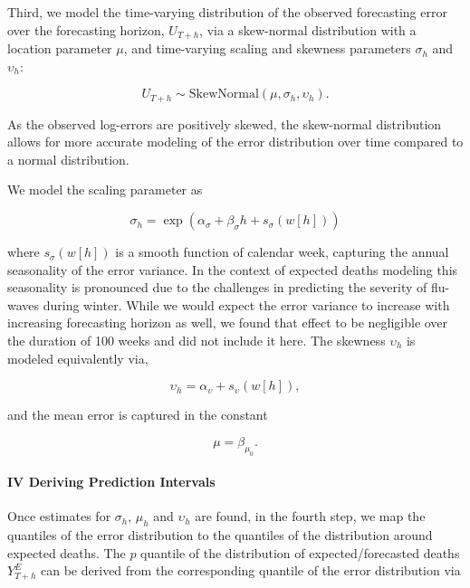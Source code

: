 \documentclass[12pt]{article}
\begin{document}
Third, we model the time-varying distribution of the observed forecasting error over the forecasting horizon, $U_{T+h}$, via a skew-normal distribution with a location parameter $\mu$, and time-varying scaling and skewness parameters $\sigma_h$ and $\upsilon_h$:

\begin{equation}
    U_{T+h} \sim \mathrm{SkewNormal}(\mu, \sigma_h, \upsilon_h).
\end{equation}

As the observed log-errors are positively skewed, the skew-normal distribution allows for more accurate modeling of the error distribution over time compared to a normal distribution.

We model the scaling parameter as

\begin{equation}
    \sigma_{h} = \exp \left( \alpha_{\sigma} + \beta_\sigma h + s_\sigma(w[h]) \right)
\end{equation}

where $s_\sigma(w[h])$ is a smooth function of calendar week, capturing the annual seasonality of the error variance. In the context of expected deaths modeling this seasonality is pronounced due to the challenges in predicting the severity of flu-waves during winter. While we would expect the error variance to increase with increasing forecasting horizon as well, we found that effect to be negligible over the duration of 100 weeks and did not include it here. The skewness $\upsilon_{h}$ is modeled equivalently via,

\begin{equation}
    \upsilon_{h} = \alpha_{\upsilon} + s_\upsilon(w[h]),
\end{equation}

and the mean error is captured in the constant

\begin{equation}
    \mu = \beta_{\mu_0}.
\end{equation}

\paragraph{IV Deriving Prediction Intervals}

Once estimates for $\sigma_h$, $\mu_h$ and $\upsilon_h$ are found, in the fourth step, we map the quantiles of the error distribution to the quantiles of the distribution around expected deaths. The $p$ quantile of the distribution of expected/forecasted deaths $Y^E_{T+h}$ can be derived from the corresponding quantile of the error distribution via
\end{document}
